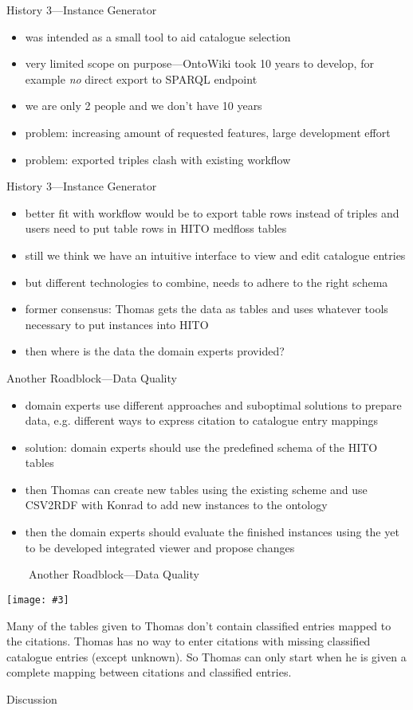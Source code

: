 \documentclass[aspectratio=1610]{beamer}
\newcommand{\imageslide}[4][]
{
\begin{frame}[plain]{~~~~#2}
\vspace{0.2em}
\begin{center}
\centering\texttt{[image: \#3]}
\end{center}
#1
\note{#4}
\end{frame}
}
\begin{document}
\begin{frame}{History 3---Instance Generator}
\begin{itemize}
  \item was intended as a small tool to aid catalogue selection
  \item very limited scope on purpose---OntoWiki took 10 years to develop, for example \emph{no} direct export to SPARQL endpoint
  \item we are only 2 people and we don't have 10 years
  \item problem: increasing amount of requested features, large development effort
  \item problem: exported triples clash with existing workflow
\end{itemize}
\end{frame}

\begin{frame}{History 3---Instance Generator}
\begin{itemize}
  \item better fit with workflow would be to export table rows instead of triples and users need to put table rows in HITO medfloss tables
  \item still we think we have an intuitive interface to view and edit catalogue entries
  \item but different technologies to combine, needs to adhere to the right schema
  \item former consensus: Thomas gets the data as tables and uses whatever tools necessary to put instances into HITO
  \item then where is the data the domain experts provided?
\end{itemize}
\end{frame}

\begin{frame}{Another Roadblock---Data Quality}
\begin{itemize}
  \item domain experts use different approaches and suboptimal solutions to prepare data, e.g. different ways to express citation to catalogue entry mappings
  \item solution: domain experts should use the predefined schema of the HITO tables
  \item then Thomas can create new tables using the existing scheme and use CSV2RDF with Konrad to add new instances to the ontology
  \item then the domain experts should evaluate the finished instances using the yet to be developed integrated viewer and propose changes
\end{itemize}
\end{frame}

\imageslide[Many of the tables given to Thomas don't contain classified entries mapped to the citations. Thomas has no way to enter citations with missing classified catalogue entries (except unknown). So Thomas can only start when he is given a complete mapping between citations and classified entries.]{Another Roadblock---Data Quality}{img/missing-mappings.png}{}

\begin{frame}{Discussion}
\end{frame}
\end{document}
